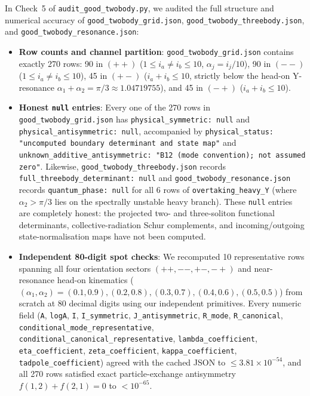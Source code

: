 \documentclass[11pt,a4paper]{article}
\begin{document}
In Check~5 of \texttt{audit\_good\_twobody.py}, we audited the full structure and numerical accuracy of \texttt{good\_twobody\_grid.json}, \texttt{good\_twobody\_threebody.json}, and \texttt{good\_twobody\_resonance.json}:
\begin{itemize}
\item \textbf{Row counts and channel partition}: \texttt{good\_twobody\_grid.json} contains exactly 270 rows: 90 in $(++)$ ($1\le i_a \neq i_b \le 10$, $\alpha_j = i_j/10$), 90 in $(--)$ ($1\le i_a \neq i_b \le 10$), 45 in $(+-)$ ($i_a + i_b \le 10$, strictly below the head-on Y-resonance $\alpha_1+\alpha_2 = \pi/3 \approx 1.04719755$), and 45 in $(-+)$ ($i_a + i_b \le 10$).
\item \textbf{Honest \texttt{null} entries}: Every one of the 270 rows in \texttt{good\_twobody\_grid.json} has \texttt{physical\_symmetric: null} and \texttt{physical\_antisymmetric: null}, accompanied by \texttt{physical\_status: "uncomputed boundary determinant and state map"} and \texttt{unknown\_additive\_antisymmetric: "B12 (mode convention); not assumed zero"}. Likewise, \texttt{good\_twobody\_threebody.json} records \texttt{full\_threebody\_determinant: null} and \texttt{good\_twobody\_resonance.json} records \texttt{quantum\_phase: null} for all 6 rows of \texttt{overtaking\_heavy\_Y} (where $\alpha_2 > \pi/3$ lies on the spectrally unstable heavy branch). These \texttt{null} entries are completely honest: the projected two- and three-soliton functional determinants, collective-radiation Schur complements, and incoming/outgoing state-normalisation maps have not been computed.
\item \textbf{Independent 80-digit spot checks}: We recomputed 10 representative rows spanning all four orientation sectors $(++, --, +-, -+)$ and near-resonance head-on kinematics ($(\alpha_1,\alpha_2) = (0.1,0.9), (0.2,0.8), (0.3,0.7), (0.4,0.6), (0.5,0.5)$) from scratch at 80 decimal digits using our independent primitives. Every numeric field (\texttt{A}, \texttt{logA}, \texttt{I}, \texttt{I\_symmetric}, \texttt{J\_antisymmetric}, \texttt{R\_mode}, \texttt{R\_canonical}, \texttt{conditional\_mode\_representative}, \texttt{conditional\_canonical\_representative}, \texttt{lambda\_coefficient}, \texttt{eta\_coefficient}, \texttt{zeta\_coefficient}, \texttt{kappa\_coefficient}, \texttt{tadpole\_coefficient}) agreed with the cached JSON to $\le 3.81\times 10^{-54}$, and all 270 rows satisfied exact particle-exchange antisymmetry $f(1,2) + f(2,1) = 0$ to $<10^{-65}$.
\end{itemize}
\end{document}
